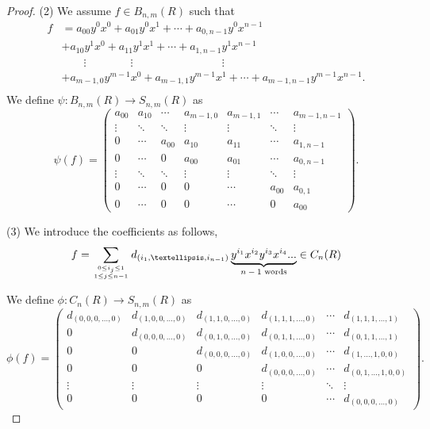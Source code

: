 \documentclass[10pt,a4paper]{amsart}
\begin{document}
\begin{proof}
(2) We assume $f \in B_{n,m}(R)$ such that 
\begin{align*}
    f &=  a_{00}y^0x^0 + a_{01}y^0x^1 + \cdots + a_{0,n-1}y^0x^{n-1}  \\
      &+  a_{10}y^1x^0 + a_{11}y^1x^1 + \cdots + a_{1,n-1}y^1x^{n-1}   \\
      & \qquad \vdots   \qquad \qquad \vdots  \qquad \qquad \qquad \qquad  \vdots   \\
      &+ a_{m-1,0}y^{m-1}x^0 + a_{m-1,1}y^{m-1}x^1 + \cdots + a_{m-1,n-1}y^{m-1}x^{n-1}.    \\
\end{align*}
We define $\psi :  B_{n,m}(R) \to  S_{n,m}(R)$ as 
$$\psi(f)=
 \begin{pmatrix}
   a_{00} & a_{10} & \cdots & a_{m-1,0} & a_{m-1,1} & \cdots & a_{m-1,n-1}\\
   \vdots  & \ddots & \ddots & \vdots & \vdots & \ddots & \vdots \\
   0 & \cdots & a_{00} & a_{10} & a_{11} & \cdots & a_{1,n-1} \\
   0 & \cdots & 0 & a_{00} & a_{01} & \cdots & a_{0,n-1} \\
   \vdots  & \ddots & \ddots & \vdots & \vdots & \ddots & \vdots \\
   0 & \cdots & 0 & 0  & \cdots & a_{00} & a_{0,1} \\
   0 & \cdots & 0 & 0  & \cdots & 0 & a_{00}
\end{pmatrix}.$$

(3) We introduce the coefficients as follows,
$$f= \sum_{0\le i_j \le 1\atop 1 \le j \le n-1}d_{(i_1, \dots , i_{n-1})}\underbrace{y^{i_1}x^{i_2}y^{i_3}x^{i_4}...}_{\text{$n-1$ words}}\in C_{n}(R)$$

We define $\phi :  C_{n}(R) \to  S_{n,m}(R)$ as 
$$\phi(f)=
\begin{pmatrix}
   d_{(0,0,0, \dots,0)} & d_{(1,0,0, \dots,0)} & d_{(1,1,0, \dots,0)} & d_{(1,1,1, \dots,0)} & \cdots & d_{(1,1,1, \dots,1)}\\
   0 & d_{(0,0,0, \dots,0)} & d_{(0,1,0, \dots,0)} & d_{(0,1,1, \dots,0)} & \cdots & d_{(0,1,1, \dots,1)} \\
   0 & 0 & d_{(0,0,0, \dots,0)} & d_{(1,0,0, \dots,0)} & \cdots & d_{(1,\dots,1,0,0)}\\
   0 & 0 & 0 & d_{(0,0,0, \dots,0)} & \cdots & d_{(0,1,\dots,1,0,0)} \\
   \vdots  & \vdots & \vdots & \vdots & \ddots & \vdots \\
   0 &  0 & 0  & 0  & \cdots & d_{(0,0,0, \dots,0)}
\end{pmatrix}.$$
\end{proof}
\end{document}

